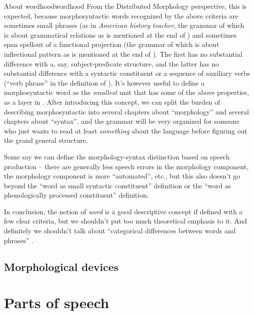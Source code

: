 \documentclass[UTF8, a4paper, oneside, scheme=plain]{ctexrep}
\newcommand*{\term}[1]{\emph{#1}}
\newcommand{\corpus}[1]{\emph{#1}}
\begin{document}
\begin{theorybox}{About wordhood}{wordhood}
    From the Distributed Morphology perspective,
    this is expected,
    because morphosyntactic words recognized by the above criteria 
    are sometimes small phrases
    (as in \corpus{American history teacher}, 
    the grammar of which is about grammatical relations 
    as is mentioned at the end of ) 
    and sometimes span spellout of a functional projection
    (the grammar of which is about inflectional pattern 
    as is mentioned at the end of ).
    The first has no substantial difference with a, say, subject-predicate structure,
    and the latter has no substantial difference with a syntactic constituent or 
    a sequence of auxiliary verbs
    (``verb phrase'' in the definition of \citet{dixon2009basic1}).
    It's however useful to define a morphosyntactic word as the \emph{smallest} unit 
    that has some of the above properties,
    as a layer in .
    After introducing this concept,
    we can split the burden of describing morphosyntactic 
    into several chapters about ``morphology''
    and several chapters about ``syntax'',
    and the grammar will be very organized 
    for someone who just wants to read at least \emph{something} about the language 
    before figuring out the grand general structure.

    Some say we can define the morphology-syntax distinction based on speech production -- 
    there are generally less speech errors in the morphology component,
    the morphology component is more ``automated'', etc.,
    but this also doesn't go beyond the ``word as small syntactic constituent'' definition 
    or the ``word as phonologically processed constituent'' definition.

    In conclusion, the notion of \term{word} is a good descriptive concept
    if defined with a few clear criteria,
    but we shouldn't put too much theoretical emphasis to it.
    And definitely we shouldn't talk about ``categorical differences between words and phrases'' 
    \citep{bruening2018lexicalist}.
\end{theorybox}

\subsection{Morphological devices}

\section{Parts of speech}
\end{document}
